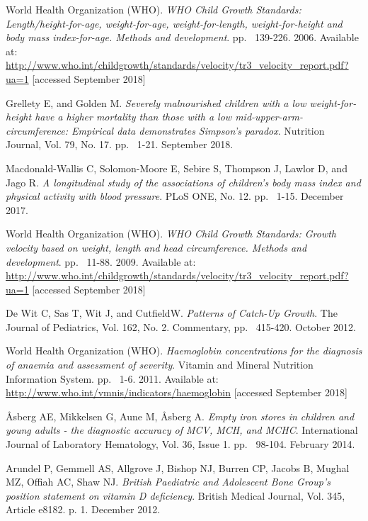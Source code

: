 \begin{thebibliography}{50}
  World Health Organization (WHO).
  \textit{WHO Child Growth Standards: Length/height-for-age, weight-for-age, weight-for-length, weight-for-height and body mass index-for-age. Methods and development}.
  pp. ~139-226.
  2006.
  Available at: \url{http://www.who.int/childgrowth/standards/velocity/tr3_velocity_report.pdf?ua=1} [accessed September 2018]

  Grellety E, and Golden M.
  \textit{Severely malnourished children with a low weight-for-height have a higher mortality than those with a low mid-upper-arm-circumference: Empirical data demonstrates Simpson’s paradox}.
  Nutrition Journal, Vol. 79, No. 17.
  pp. ~1-21.
  September 2018.
  
  Macdonald-Wallis C, Solomon-Moore E, Sebire S, Thompson J, Lawlor D, and Jago R.
  \textit{A longitudinal study of the associations of children’s body mass index and physical activity with blood pressure}.
  PLoS ONE, No. 12.
  pp. ~1-15.
  December 2017.
  
  World Health Organization (WHO).
  \textit{WHO Child Growth Standards: Growth velocity based on weight, length and head circumference. Methods and development}.
  pp. ~11-88.
  2009.
  Available at: \url{http://www.who.int/childgrowth/standards/velocity/tr3_velocity_report.pdf?ua=1} [accessed September 2018]
   
  De Wit C, Sas T, Wit J, and CutfieldW.
  \textit{Patterns of Catch-Up Growth}.
  The Journal of Pediatrics, Vol. 162, No. 2.
  Commentary, pp. ~415-420.
  October 2012.

  World Health Organization (WHO).
  \textit{Haemoglobin concentrations for the diagnosis of anaemia and assessment of severity}.
  Vitamin and Mineral Nutrition Information System.
  pp. ~1-6.
  2011.
  Available at: \url{http://www.who.int/vmnis/indicators/haemoglobin} [accessed September 2018]

  Åsberg AE, Mikkelsen G, Aune M, Åsberg A.
  \textit{Empty iron stores in children and young adults - the diagnostic accuracy of MCV, MCH, and MCHC}.
  International Journal of Laboratory Hematology, Vol. 36, Issue 1.
  pp. ~98-104.
  February 2014.

  Arundel P, Gemmell AS, Allgrove J, Bishop NJ, Burren CP, Jacobs B, Mughal MZ, Offiah AC, Shaw NJ.
  \textit{British Paediatric and Adolescent Bone Group’s position statement on vitamin D deficiency}.
  British Medical Journal, Vol. 345, Article e8182.
  p. 1.
  December 2012.


\end{thebibliography}
